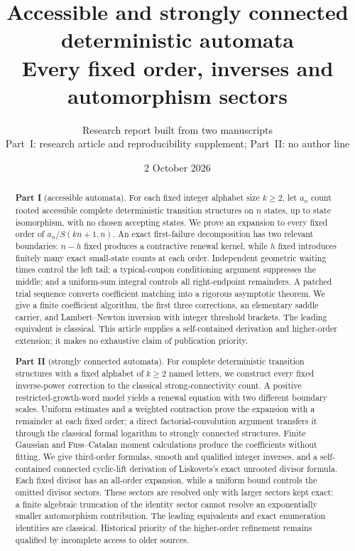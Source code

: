 \documentclass[11pt,letterpaper]{article}
\title{Accessible and strongly connected deterministic automata\\[5pt]\large Every fixed order, inverses and automorphism sectors}
\author{Research report built from two manuscripts\\[2pt]\small Part~I: research article and reproducibility supplement; Part~II: no author line}
\date{2 October 2026}
\theoremstyle{remark}\newtheorem{remark}[theorem]{Remark}
\numberwithin{equation}{section}
\begin{document}
\maketitle
\begin{abstract}
\noindent\textbf{Part I} (accessible automata).
For each fixed integer alphabet size $k\ge2$, let $a_n$ count rooted accessible complete deterministic transition structures on $n$ states, up to state isomorphism, with no chosen accepting states. We prove an expansion to every fixed order of $a_n/S(kn+1,n)$. An exact first-failure decomposition has two relevant boundaries: $n-h$ fixed produces a contractive renewal kernel, while $h$ fixed introduces finitely many exact small-state counts at each order. Independent geometric waiting times control the left tail; a typical-coupon conditioning argument suppresses the middle; and a uniform-sum integral controls all right-endpoint remainders. A patched trial sequence converts coefficient matching into a rigorous asymptotic theorem. We give a finite coefficient algorithm, the first three corrections, an elementary saddle carrier, and Lambert--Newton inversion with integer threshold brackets. The leading equivalent is classical. This article supplies a self-contained derivation and higher-order extension; it makes no exhaustive claim of publication priority.

\smallskip\noindent\textbf{Part II} (strongly connected automata).
For complete deterministic transition structures with a fixed alphabet of $k\ge2$ named letters, we construct every fixed inverse-power correction to the classical strong-connectivity count. A positive restricted-growth-word model yields a renewal equation with two different boundary scales. Uniform estimates and a weighted contraction prove the expansion with a remainder at each fixed order; a direct factorial-convolution argument transfers it through the classical formal logarithm to strongly connected structures. Finite Gaussian and Fuss--Catalan moment calculations produce the coefficients without fitting. We give third-order formulas, smooth and qualified integer inverses, and a self-contained connected cyclic-lift derivation of Liskovets's exact unrooted divisor formula. Each fixed divisor has an all-order expansion, while a uniform bound controls the omitted divisor sectors. These sectors are resolved only with larger sectors kept exact: a finite algebraic truncation of the identity sector cannot resolve an exponentially smaller automorphism contribution. The leading equivalents and exact enumeration identities are classical. Historical priority of the higher-order refinement remains qualified by incomplete access to older sources.
\end{abstract}
\end{document}
